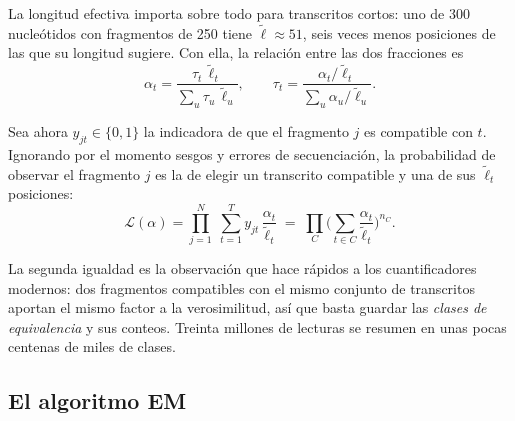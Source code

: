 La longitud efectiva importa sobre todo para transcritos cortos: uno de 300 nucleótidos con fragmentos de 250 tiene $\tilde\ell\approx51$, seis veces menos posiciones de las que su longitud sugiere. Con ella, la relación entre las dos fracciones es
\begin{equation}\label{eq:11-alfatau}
\alpha_t=\frac{\tau_t\,\tilde\ell_t}{\sum_u \tau_u\,\tilde\ell_u},\qquad
\tau_t=\frac{\alpha_t/\tilde\ell_t}{\sum_u \alpha_u/\tilde\ell_u}.
\end{equation}

\begin{simbolos}
\end{simbolos}

Sea ahora $y_{jt}\in\{0,1\}$ la indicadora de que el fragmento $j$ es compatible con $t$. Ignorando por el momento sesgos y errores de secuenciación, la probabilidad de observar el fragmento $j$ es la de elegir un transcrito compatible y una de sus $\tilde\ell_t$ posiciones:
\begin{equation}\label{eq:11-veros}
\mathcal L(\alpha)=\prod_{j=1}^{N}\;\sum_{t=1}^{T} y_{jt}\,\frac{\alpha_t}{\tilde\ell_t}
\;=\;\prod_{C}\Big(\sum_{t\in C}\frac{\alpha_t}{\tilde\ell_t}\Big)^{n_C}.
\end{equation}

\begin{simbolos}
\end{simbolos}

La segunda igualdad es la observación que hace rápidos a los cuantificadores modernos: dos fragmentos compatibles con el mismo conjunto de transcritos aportan el mismo factor a la verosimilitud, así que basta guardar las \emph{clases de equivalencia} y sus conteos. Treinta millones de lecturas se resumen en unas pocas centenas de miles de clases.

\subsection{El algoritmo EM}

